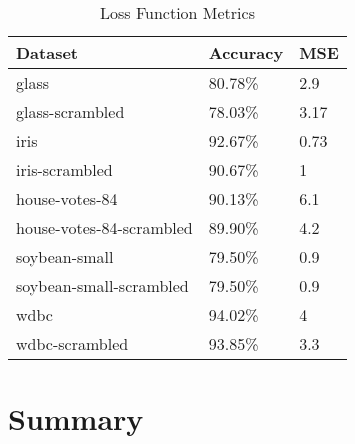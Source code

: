 \documentclass[twoside,11pt]{article}
\begin{document}
\begin{table}[h]
	\centering
	\caption{Loss Function Metrics} \label{tab:metrics}
	\begin{tabular}{|l|l|l|}
		\hline
		Dataset                  & Accuracy & MSE  \\ \hline
		glass                    & 80.78\%  & 2.9  \\ \hline
		glass-scrambled          & 78.03\%  & 3.17 \\ \hline
		iris                     & 92.67\%  & 0.73 \\ \hline
		iris-scrambled           & 90.67\%  & 1    \\ \hline
		house-votes-84           & 90.13\%  & 6.1  \\ \hline
		house-votes-84-scrambled & 89.90\%  & 4.2  \\ \hline
		soybean-small            & 79.50\%  & 0.9  \\ \hline
		soybean-small-scrambled  & 79.50\%  & 0.9  \\ \hline
		wdbc                     & 94.02\%  & 4    \\ \hline
		wdbc-scrambled           & 93.85\%  & 3.3  \\ \hline
	\end{tabular}
\end{table}

\section{Summary}


\end{document}
